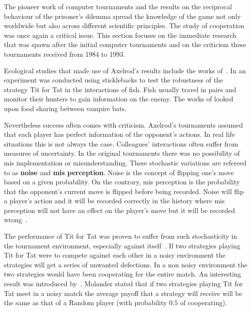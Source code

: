 \documentclass{article}
\begin{document}
The pioneer work of computer tournaments and the results on the reciprocal behaviour
of the prisoner's dilemma spread the knowledge of the game not only worldwide
but also across different scientific principles. The study of cooperation was 
once again a critical issue. This section focuses on the immediate research
that was spawn after the initial computer tournaments and on the criticism these
tournaments received from 1984 to 1993.

Ecological studies that made use of Axelrod's results include the 
works of~\cite{Godfray1992, Milinski1987, Wilkinson1984}. In\cite{Milinski1987}
an experiment was conducted using sticklebacks to test the robustness of the 
strategy Tit for Tat in the interactions of fish. Fish usually travel in pairs
and monitor their hunters to gain information on the enemy. The works of
\cite{Godfray1992, Wilkinson1984} looked upon food sharing between vampire bats.

Nevertheless success often comes with criticism. Axelrod's tournaments assumed that
each player has perfect information of the opponent's actions. In real life
situations this is not always the case. Colleagues' interactions often suffer from
measures of uncertainty. In the original tournaments there was no possibility of
mis implementation or misunderstanding. These stochastic variations are refereed
to as \textbf{noise} and \textbf{mis perception}. Noise is the concept of flipping
one's move based on a given probability. On the contrary, mis perception is the
probability that the opponent's current move is flipped before being recorded.
Noise will flip a player's action  and it will be recorded correctly in the history
where mis perception will not have an effect on the player's move but it will be
recorded wrong~\cite{Hoffmann1998}.

The performance of Tit for Tat was proven to suffer from such stochasticity in
the tournament environment, especially against itself~\cite{Bendor1991, Godfray1992,
Molander1985, Nowak1992}. If two strategies playing Tit for Tat were %
to compete against each other in a noisy environment the strategies will get 
a series of unwanted defections. In a non noisy environment
the two strategies would have been cooperating for the entire match.
An interesting result was introduced by~\cite{Molander1985}. Molander stated
that if two strategies playing Tit for Tat meet in a noisy match the average
payoff that a strategy will receive will be the same as that of a Random player
(with probability \(0.5\) of cooperating). 
\end{document}
